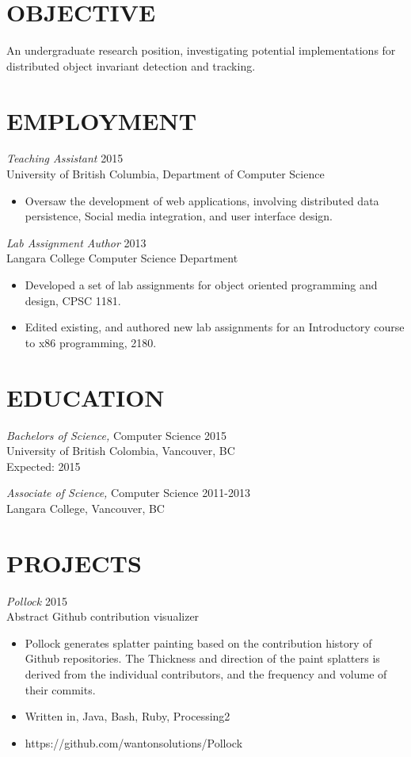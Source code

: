 \documentclass[line,margin]{res}
\begin{document}
\address{3549 Puget Drive, Vancouver, BC }
\address{(604) 970-2469}
\address{v9c9@ugrad.cs.ubc.ca}
\begin{resume}
\section{OBJECTIVE}
An undergraduate research position, investigating potential implementations for distributed object invariant detection and tracking.

\section{EMPLOYMENT} {\sl Teaching Assistant} \hfill 2015\\
	University of British Columbia, Department of Computer Science
\begin{itemize} \itemsep -2pt
		\item Oversaw the development of web applications, involving distributed data persistence, Social media integration, and user interface design.
	\end{itemize}
{\sl Lab Assignment Author} \hfill 2013\\
	Langara College Computer Science Department
	\begin{itemize} \itemsep -2pt
			\item Developed a set of lab assignments for object oriented programming and design, CPSC 1181.
			\item Edited existing, and authored new lab assignments for an Introductory course to x86 programming, 2180.
	\end{itemize}

\section{EDUCATION}
{\sl Bachelors of Science,} Computer Science	\hfill 2015\\
University of British Colombia, Vancouver, BC \\
Expected: 2015

{\sl Associate of Science,} Computer Science \hfill 2011-2013\\
Langara College, Vancouver, BC\\

\section{PROJECTS}
{\sl Pollock} \hfill 2015\\
	Abstract Github contribution visualizer
\begin{itemize} \itemsep -2pt
		\item Pollock generates splatter painting based on the contribution history of Github repositories. The Thickness and direction of the paint splatters is derived from the individual contributors, and the frequency and volume of their commits.
		\item Written in, Java, Bash, Ruby, Processing2
		\item https://github.com/wantonsolutions/Pollock
\end{itemize}


\end{resume}
\end{document}

